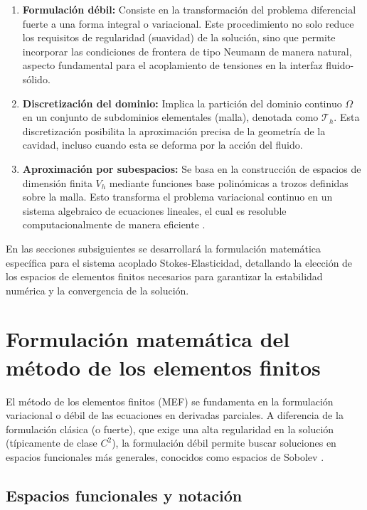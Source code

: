 \documentclass[12pt, letterpaper]{report}
\theoremstyle{definition}
\begin{document}
\begin{enumerate}
    \item \textbf{Formulación débil:} Consiste en la transformación del problema diferencial fuerte a una forma integral o variacional. Este procedimiento no solo reduce los requisitos de regularidad (suavidad) de la solución, sino que permite incorporar las condiciones de frontera de tipo Neumann de manera natural, aspecto fundamental para el acoplamiento de tensiones en la interfaz fluido-sólido.
    
    \item \textbf{Discretización del dominio:} Implica la partición del dominio continuo $\Omega$ en un conjunto de subdominios elementales (malla), denotada como $\mathcal{T}_h$. Esta discretización posibilita la aproximación precisa de la geometría de la cavidad, incluso cuando esta se deforma por la acción del fluido.
    
    \item \textbf{Aproximación por subespacios:} Se basa en la construcción de espacios de dimensión finita $V_h$ mediante funciones base polinómicas a trozos definidas sobre la malla. Esto transforma el problema variacional continuo en un sistema algebraico de ecuaciones lineales, el cual es resoluble computacionalmente de manera eficiente \cite{hecht2012new}.
\end{enumerate}

En las secciones subsiguientes se desarrollará la formulación matemática específica para el sistema acoplado Stokes-Elasticidad, detallando la elección de los espacios de elementos finitos necesarios para garantizar la estabilidad numérica y la convergencia de la solución.

\section{Formulación matemática del método de los elementos finitos}

El método de los elementos finitos (MEF) se fundamenta en la formulación variacional o débil de las ecuaciones en derivadas parciales. A diferencia de la formulación clásica (o fuerte), que exige una alta regularidad en la solución (típicamente de clase $C^2$), la formulación débil permite buscar soluciones en espacios funcionales más generales, conocidos como espacios de Sobolev \cite{quarteroni2008numerical}.

\subsection{Espacios funcionales y notación}
\end{document}
